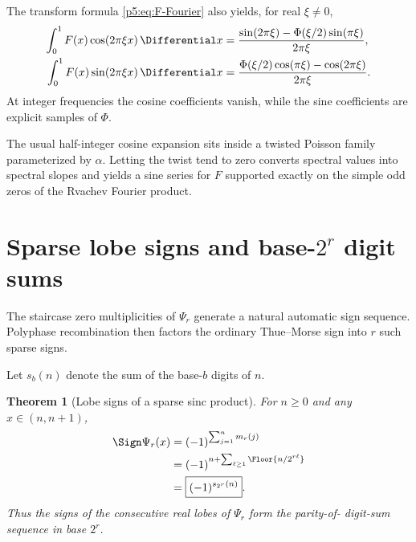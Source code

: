 \documentclass[11pt]{article}
\newtheorem{theorem}{Theorem}[section]
\theoremstyle{definition}
\theoremstyle{remark}
\begin{document}
The transform formula \eqref{p5:eq:F-Fourier} also yields, for real $\xi\ne0$,
\begin{align}
 \int_0^1F(x)\cos(2\pi\xi x)\,\Differential x
 &=\frac{\sin(2\pi\xi)-\Phi(\xi/2)\sin(\pi\xi)}{2\pi\xi}, \label{p5:eq:F-cos-transform}\\
 \int_0^1F(x)\sin(2\pi\xi x)\,\Differential x
 &=\frac{\Phi(\xi/2)\cos(\pi\xi)-\cos(2\pi\xi)}{2\pi\xi}. \label{p5:eq:F-sin-transform}
\end{align}
At integer frequencies the cosine coefficients vanish, while the sine
coefficients are explicit samples of $\Phi$.

\begin{resultboxPartiv}
The usual half-integer cosine expansion sits inside a twisted Poisson family
parameterized by $\alpha$.  Letting the twist tend to zero converts spectral
values into spectral slopes and yields a sine series for $F$ supported exactly
on the simple odd zeros of the Rvachev Fourier product.
\end{resultboxPartiv}

\section{Sparse lobe signs and base-\texorpdfstring{$2^r$}{2-to-the-r} digit sums}
\label{p5:sec:sparse-signs}

The staircase zero multiplicities of $\Psi_r$ generate a natural automatic
sign sequence.  Polyphase recombination then factors the ordinary Thue--Morse
sign into $r$ such sparse signs.

Let $s_b(n)$ denote the sum of the base-$b$ digits of $n$.

\begin{theorem}[Lobe signs of a sparse sinc product]
\label{p5:thm:sparse-lobe-sign}
For $n\ge0$ and any $x\in(n,n+1)$,
\begin{align}
 \Sign\Psi_r(x)
 &=(-1)^{\sum_{j=1}^{n}m_r(j)}                             \label{p5:eq:sparse-sign-zero-count}\\
 &=(-1)^{n+\sum_{\ell\ge1}\Floor{n/2^{r\ell}}}    \label{p5:eq:sparse-sign-floor}\\
 &=\boxed{(-1)^{s_{2^r}(n)}}.                             \label{p5:eq:sparse-sign-base}
\end{align}
Thus the signs of the consecutive real lobes of $\Psi_r$ form the parity-of-
digit-sum sequence in base $2^r$.
\end{theorem}
\end{document}

